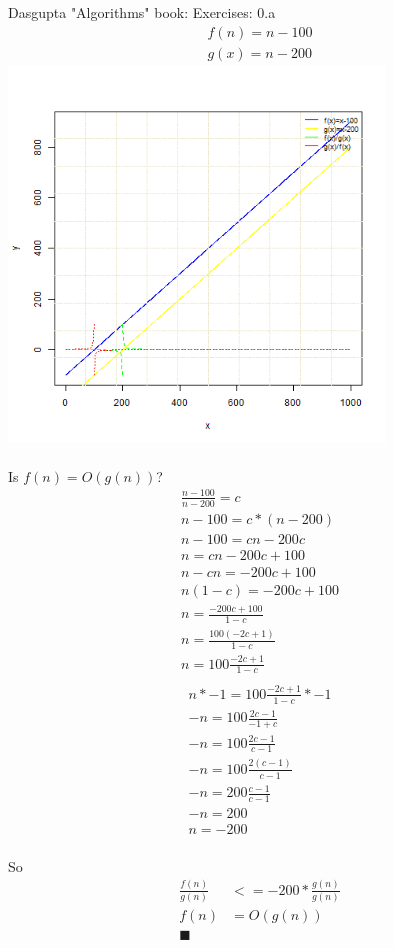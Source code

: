 \documentclass[10pt,a4paper]{article}
\author{Daniel Frederico Lins Leite}
\begin{document}
	
Dasgupta "Algorithms" book:
Exercises:
0.a
\begin{align*}
	f(n) = n - 100\\
	g(x) = n - 200 
\end{align*}
\includegraphics[width=10cm]{0_a.png}
\paragraph{}
Is $f(n)=O(g(n))$?
\begin{align*}
	\frac{n-100}{n-200} = c\\
	n-100=c*(n-200)\\
	n-100=cn-200c\\
	n=cn-200c+100\\
	n-cn=-200c+100\\
	n(1-c)=-200c+100\\
	n=\frac{-200c+100}{1-c}\\
	n=\frac{100(-2c+1)}{1-c}\\
	n=100\frac{-2c+1}{1-c}\\
\end{align*}
\begin{align*}
	n*-1=100\frac{-2c+1}{1-c}*-1\\
	-n=100\frac{2c-1}{-1+c}\\
	-n=100\frac{2c-1}{c-1}\\
	-n=100\frac{2(c-1)}{c-1}\\
	-n=200\frac{c-1}{c-1}\\
	-n=200\\
	n=-200
\end{align*}
\paragraph{}
So
\begin{align*}
	\frac{f(n)}{g(n)}&<=-200*\frac{g(n)}{g(n)}\\
	f(n) &= O(g(n))\\
	\blacksquare
\end{align*}
\end{document}
